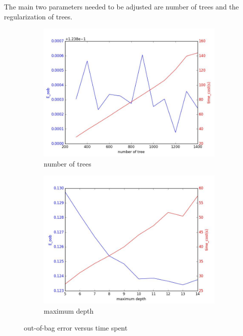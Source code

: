 \documentclass[12pt]{article}
\begin{document}
The main two parameters needed to be adjusted are number of trees and the regularization of trees.
\begin{figure}[H]
	\centering
	\begin{subfigure}{.4\textwidth}
		\centering
		\includegraphics[width=1.0\linewidth]{RF-1.jpg}
		\caption{number of trees}
		\label{rf-1}
	\end{subfigure}
	\begin{subfigure}{.4\textwidth}
		\centering
		\includegraphics[width=1.0\linewidth]{RF-2.jpg}
		\caption{maximum depth}
		\label{rf-2}
	\end{subfigure}
	\caption{out-of-bag error versus time spent}
\end{figure}
\end{document}
